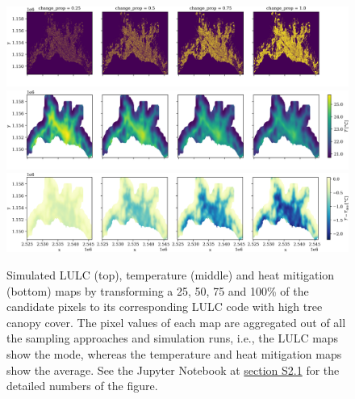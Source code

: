 \documentclass[10pt,letterpaper]{article}
\begin{document}
\begin{figure}
  \begin{adjustwidth}{-.4\textwidth}{0cm}
    \includegraphics[width=\linewidth]{figures/scenario-lulc-maps.png}
    \includegraphics[width=\linewidth]{figures/scenario-T-maps.png}
    \includegraphics[width=\linewidth]{figures/scenario-heat-mitigation-maps.png}
    \caption{\label{fig:scenario-maps} Simulated LULC (top), temperature (middle) and heat mitigation (bottom) maps by transforming a 25, 50, 75 and 100\% of the candidate pixels to its corresponding LULC code with high tree canopy cover. The pixel values of each map are aggregated out of all the sampling approaches and simulation runs, i.e., the LULC maps show the mode, whereas the temperature and heat mitigation maps show the average. See the Jupyter Notebook at \hyperref[sec:si-scenarios]{section S2.1} for the detailed numbers of the figure.}
  \end{adjustwidth}
\end{figure}
\end{document}
